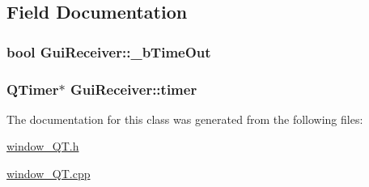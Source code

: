 \subsection{Field Documentation}
\hypertarget{classGuiReceiver_ad2d629b90a37e814db074e7ba1fc1aa9}{
\subsubsection[{\-\_\-b\-Time\-Out}]{\setlength{\rightskip}{0pt plus 5cm}bool Gui\-Receiver\-::\-\_\-b\-Time\-Out}}\label{classGuiReceiver_ad2d629b90a37e814db074e7ba1fc1aa9}
\hypertarget{classGuiReceiver_aeb64966586c4a35cfc02db46491afdf6}{
\subsubsection[{timer}]{\setlength{\rightskip}{0pt plus 5cm}Q\-Timer$\ast$ Gui\-Receiver\-::timer}}\label{classGuiReceiver_aeb64966586c4a35cfc02db46491afdf6}


The documentation for this class was generated from the following files\-:\begin{DoxyCompactItemize}
\item 
\hyperlink{window__QT_8h}{window\-\_\-\-Q\-T.\-h}\item 
\hyperlink{window__QT_8cpp}{window\-\_\-\-Q\-T.\-cpp}\end{DoxyCompactItemize}
